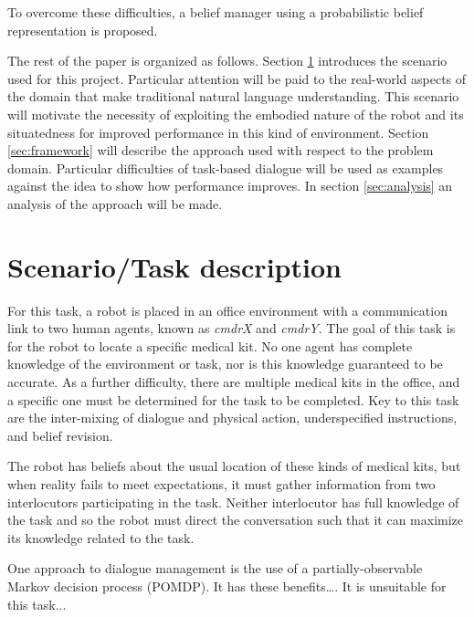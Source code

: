 \documentclass[12pt]{article}
\begin{document}
To overcome these difficulties, a belief manager using a probabilistic
belief representation is proposed.

The rest of the paper is organized as follows. Section
\ref{sec:scenaro} introduces the scenario used for this
project. Particular attention will be paid to the real-world aspects
of the domain that make traditional natural language
understanding. This scenario will motivate the necessity of exploiting
the embodied nature of the robot and its situatedness for improved
performance in this kind of environment. Section \ref{sec:framework}
will describe the approach used with respect to the problem
domain. Particular difficulties of task-based dialogue will be used as
examples against the idea to show how performance improves. In section
\ref{sec:analysis} an analysis of the approach will be made.

\section{Scenario/Task description}
\label{sec:scenaro}
For this task, a robot is placed in an office environment with a
communication link to two human agents, known as \textit{cmdrX} and
\textit{cmdrY}. The goal of this task is for the robot to locate a
specific medical kit. No one agent has complete knowledge of the
environment or task, nor is this knowledge guaranteed to be accurate.
As a further difficulty, there are multiple medical kits in the
office, and a specific one must be determined for the task to be
completed. Key to this task are the inter-mixing of dialogue and
physical action, underspecified instructions, and belief revision.

The robot has beliefs about the usual location of these kinds of
medical kits, but when reality fails to meet expectations, it must
gather information from two interlocutors participating in the
task. Neither interlocutor has full knowledge of the task and so the
robot must direct the conversation such that it can maximize its
knowledge related to the task.

One approach to dialogue management is the use of a
partially-observable Markov decision process (POMDP). It has these
benefits\dots. It is unsuitable for this task...
\end{document}

